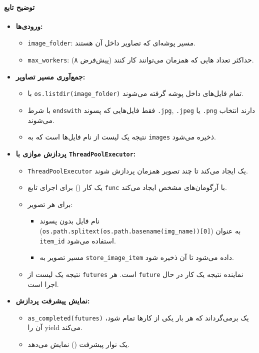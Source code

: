 \documentclass{article}
\begin{document}
\paragraph{توضیح تابع}
\begin{itemize}
    \item \textbf{ورودی‌ها:}
    \begin{itemize}
        \item \texttt{image\_folder}: مسیر پوشه‌ای که تصاویر داخل آن هستند.
        \item \texttt{max\_workers}: حداکثر تعداد ‌هایی که همزمان می‌توانند کار کنند (پیش‌فرض ۸).
    \end{itemize}
    \item \textbf{جمع‌آوری مسیر تصاویر:}
    \begin{itemize}
        \item با \texttt{os.listdir(image\_folder)} تمام فایل‌های داخل پوشه گرفته می‌شوند.
        \item با شرط \texttt{endswith} فقط فایل‌هایی که پسوند \texttt{.jpg}, \texttt{.jpeg} یا \texttt{.png} دارند انتخاب می‌شوند.
        \item نتیجه یک لیست از نام فایل‌ها است که به \texttt{images} ذخیره می‌شود.
    \end{itemize}
    \item \textbf{پردازش موازی با \texttt{ThreadPoolExecutor}:}
    \begin{itemize}
        \item \texttt{ThreadPoolExecutor} یک  ایجاد می‌کند تا چند تصویر همزمان پردازش شوند.
        \item \texttt{} یک کار () برای اجرای تابع \texttt{func} با آرگومان‌های مشخص ایجاد می‌کند.
        \item برای هر تصویر:
        \begin{itemize}
            \item نام فایل بدون پسوند (\texttt{os.path.splitext(os.path.basename(img\_name))[0]}) به عنوان \texttt{item\_id} استفاده می‌شود.
            \item مسیر تصویر به \texttt{store\_image\_item} داده می‌شود تا  آن ذخیره شود.
        \end{itemize}
        \item نتیجه یک لیست از \texttt{futures} است. هر \texttt{future} نماینده نتیجه یک کار در حال اجرا است.
    \end{itemize}
    \item \textbf{نمایش پیشرفت پردازش:}
    \begin{itemize}
        \item \texttt{as\_completed(futures)} یک  برمی‌گرداند که هر بار یکی از کارها تمام شود، آن را yield می‌کند.
        \item \texttt{} یک نوار پیشرفت () نمایش می‌دهد.
    \end{itemize}
\end{itemize}
\end{document}
